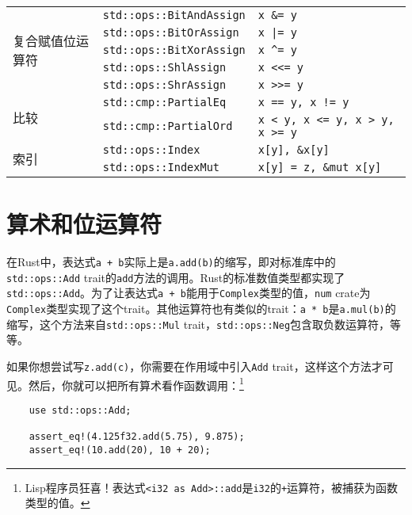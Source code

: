\begin{table}[htbp]
\begin{tabular}{lll}
        \multirow{5}{*}{复合赋值位运算符} & \texttt{std::ops::BitAndAssign} \cellcolor{tablecolor} & \texttt{x \&= y} \cellcolor{tablecolor} \\
        & \texttt{std::ops::BitOrAssign}& \texttt{x |= y} \\
        & \texttt{std::ops::BitXorAssign} \cellcolor{tablecolor} & \texttt{x \^{}= y} \cellcolor{tablecolor} \\
        & \texttt{std::ops::ShlAssign}  & \texttt{x <<= y} \\
        & \texttt{std::ops::ShrAssign}    \cellcolor{tablecolor} & \texttt{x >>= y}   \cellcolor{tablecolor} \\
        \hline

        \multirow{2}{*}{比较}   & \texttt{std::cmp::PartialEq}  & \texttt{x == y, x != y}   \\
        & \texttt{std::cmp::PartialOrd} \cellcolor{tablecolor} & \texttt{x < y, x <= y, x > y, x >= y} \cellcolor{tablecolor} \\
        \hline

        \multirow{2}{*}{索引}   & \texttt{std::ops::Index}  & \texttt{x[y], \&x[y]} \\
        & \texttt{std::ops::IndexMut} \cellcolor{tablecolor} & \texttt{x[y] = z, \&mut x[y]} \cellcolor{tablecolor} \\
    \end{tabular}
\end{table}

\section{算术和位运算符}

在Rust中，表达式\texttt{a + b}实际上是\texttt{a.add(b)}的缩写，即对标准库中的\texttt{std::ops::Add} trait的\texttt{add}方法的调用。Rust的标准数值类型都实现了\texttt{std::ops::Add}。为了让表达式\texttt{a + b}能用于\texttt{Complex}类型的值，\texttt{num} crate为\texttt{Complex}类型实现了这个trait。其他运算符也有类似的trait：\texttt{a * b}是\texttt{a.mul(b)}的缩写，这个方法来自\texttt{std::ops::Mul} trait，\texttt{std::ops::Neg}包含取负数运算符，等等。

如果你想尝试写\texttt{z.add(c)}，你需要在作用域中引入\texttt{Add} trait，这样这个方法才可见。然后，你就可以把所有算术看作函数调用：\footnote{Lisp程序员狂喜！表达式\texttt{<i32 as Add>::add}是\texttt{i32}的\texttt{+}运算符，被捕获为函数类型的值。}

\begin{verbatim}
    use std::ops::Add;

    assert_eq!(4.125f32.add(5.75), 9.875);
    assert_eq!(10.add(20), 10 + 20);
\end{verbatim}


